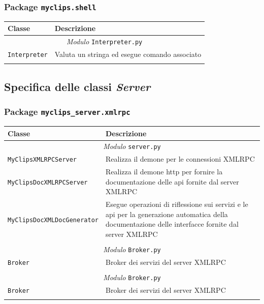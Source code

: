 \subsubsection{Package \texttt{myclips.shell}}

\begin{longtable}{p{5.5cm}p{6.5cm}}
\hline 
\textbf{Classe} & \textbf{Descrizione} \\ 
\hline\hline 
\endhead

\multicolumn{2}{c}{\emph{Modulo} \texttt{Interpreter.py}}\\
	\hdashline[5pt/5pt]
		\texttt{Interpreter} & Valuta un stringa ed esegue comando associato \\ 
	\hline\\

\end{longtable}

\subsection{Specifica delle classi \emph{Server}}

\subsubsection{Package \texttt{myclips\_server.xmlrpc}}

\begin{longtable}{p{5.5cm}p{6.5cm}}
\hline 
\textbf{Classe} & \textbf{Descrizione} \\ 
\hline\hline 
\endhead

\multicolumn{2}{c}{\emph{Modulo} \texttt{server.py}}\\
	\hdashline[5pt/5pt]
		\texttt{MyClipsXMLRPCServer} & Realizza il demone per le connessioni XMLRPC \\ 
	\hdashline[1pt/5pt]
		\texttt{MyClipsDocXMLRPCServer} & Realizza il demone http per fornire la documentazione delle api fornite dal server XMLRPC \\ 
	\hdashline[1pt/5pt]
		\texttt{MyClipsDocXMLDocGenerator} & Esegue operazioni di riflessione sui servizi e le api per la generazione automatica della documentazione delle interfacce fornite dal server XMLRPC \\ 
	\hline\\
	
\multicolumn{2}{c}{\emph{Modulo} \texttt{Broker.py}}\\
	\hdashline[5pt/5pt]
		\texttt{Broker} & Broker dei servizi del server XMLRPC \\ 
	\hline\\

\multicolumn{2}{c}{\emph{Modulo} \texttt{Broker.py}}\\
	\hdashline[5pt/5pt]
		\texttt{Broker} & Broker dei servizi del server XMLRPC \\ 
	\hline\\
	

\end{longtable}


